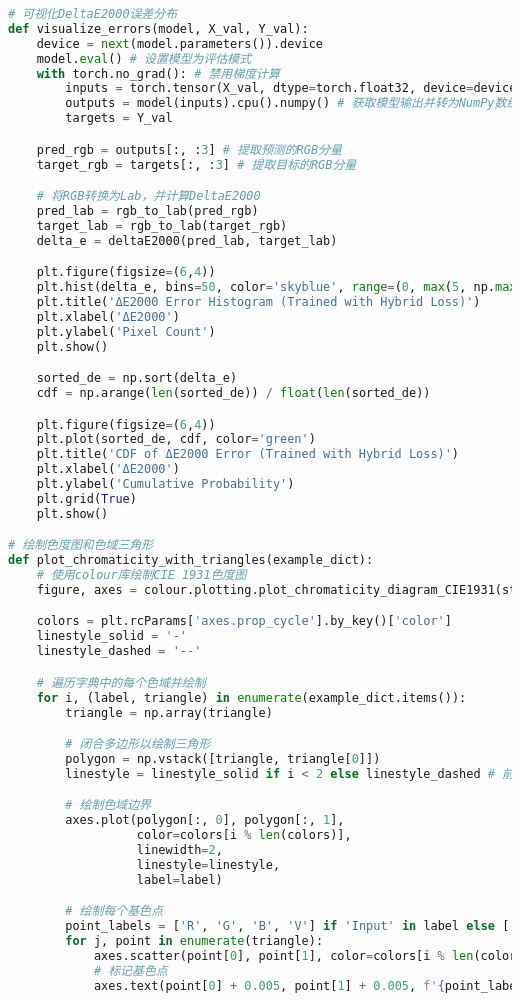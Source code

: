 \begin{lstlisting}[language=Python]
# 可视化DeltaE2000误差分布
def visualize_errors(model, X_val, Y_val):
    device = next(model.parameters()).device
    model.eval() # 设置模型为评估模式
    with torch.no_grad(): # 禁用梯度计算
        inputs = torch.tensor(X_val, dtype=torch.float32, device=device)
        outputs = model(inputs).cpu().numpy() # 获取模型输出并转为NumPy数组
        targets = Y_val

    pred_rgb = outputs[:, :3] # 提取预测的RGB分量
    target_rgb = targets[:, :3] # 提取目标的RGB分量

    # 将RGB转换为Lab，并计算DeltaE2000
    pred_lab = rgb_to_lab(pred_rgb)
    target_lab = rgb_to_lab(target_rgb)
    delta_e = deltaE2000(pred_lab, target_lab)

    plt.figure(figsize=(6,4))
    plt.hist(delta_e, bins=50, color='skyblue', range=(0, max(5, np.max(delta_e))))
    plt.title('ΔE2000 Error Histogram (Trained with Hybrid Loss)')
    plt.xlabel('ΔE2000')
    plt.ylabel('Pixel Count')
    plt.show()

    sorted_de = np.sort(delta_e)
    cdf = np.arange(len(sorted_de)) / float(len(sorted_de))

    plt.figure(figsize=(6,4))
    plt.plot(sorted_de, cdf, color='green')
    plt.title('CDF of ΔE2000 Error (Trained with Hybrid Loss)')
    plt.xlabel('ΔE2000')
    plt.ylabel('Cumulative Probability')
    plt.grid(True)
    plt.show()

# 绘制色度图和色域三角形
def plot_chromaticity_with_triangles(example_dict):
    # 使用colour库绘制CIE 1931色度图
    figure, axes = colour.plotting.plot_chromaticity_diagram_CIE1931(standalone=False)

    colors = plt.rcParams['axes.prop_cycle'].by_key()['color']
    linestyle_solid = '-'
    linestyle_dashed = '--'

    # 遍历字典中的每个色域并绘制
    for i, (label, triangle) in enumerate(example_dict.items()):
        triangle = np.array(triangle)

        # 闭合多边形以绘制三角形
        polygon = np.vstack([triangle, triangle[0]])
        linestyle = linestyle_solid if i < 2 else linestyle_dashed # 前两个用实线，后面用虚线

        # 绘制色域边界
        axes.plot(polygon[:, 0], polygon[:, 1],
                  color=colors[i % len(colors)],
                  linewidth=2,
                  linestyle=linestyle,
                  label=label)

        # 绘制每个基色点
        point_labels = ['R', 'G', 'B', 'V'] if 'Input' in label else ['R', 'G', 'C', 'B', 'X']
        for j, point in enumerate(triangle):
            axes.scatter(point[0], point[1], color=colors[i % len(colors)], s=70, zorder=5, edgecolors='black')
            # 标记基色点
            axes.text(point[0] + 0.005, point[1] + 0.005, f'{point_labels[j]}', fontsize=10, color='black')


\end{lstlisting}

